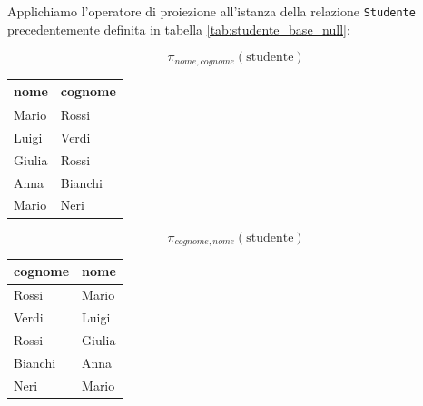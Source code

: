 \begin{example}
    Applichiamo l'operatore di proiezione all'istanza della relazione \texttt{Studente} precedentemente definita in tabella \ref{tab:studente_base_null}:
    \begin{table}[H]
        \centering
        
        \begin{minipage}{0.32\textwidth}
            \centering
            $$ \pi_{nome, cognome}(\text{studente}) $$
            \vspace{0.1cm}
            \renewcommand{\arraystretch}{1.2}
            \begin{tabular}{ll}
                \toprule
                \textbf{nome} & \textbf{cognome} \\
                \midrule
                Mario  & Rossi   \\
                Luigi  & Verdi   \\
                Giulia & Rossi   \\
                Anna   & Bianchi \\
                Mario  & Neri    \\
                \bottomrule
            \end{tabular}
        \end{minipage}\hfill
        \begin{minipage}{0.32\textwidth}
            \centering
            $$ \pi_{cognome, nome}(\text{studente}) $$
            \vspace{0.1cm}
            \renewcommand{\arraystretch}{1.2}
            \begin{tabular}{ll}
                \toprule
                \textbf{cognome} & \textbf{nome} \\
                \midrule
                Rossi   & Mario  \\
                Verdi   & Luigi  \\
                Rossi   & Giulia \\
                Bianchi & Anna   \\
                Neri    & Mario  \\
                \bottomrule
            \end{tabular}
        \end{minipage}\hfill
        \begin{minipage}{0.28\textwidth}

\end{minipage}
\end{table}
\end{example}
